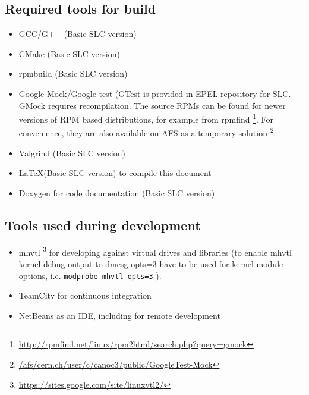 \subsection{Required tools for build}
\begin{itemize}
\item{}GCC/G++ (Basic SLC version)
\item{}CMake (Basic SLC version)
\item{}rpmbuild (Basic SLC version)
\item{}Google Mock/Google test (GTest is provided in EPEL repository for SLC. 
  GMock requires recompilation. The source RPMs can be found for newer versions of RPM based distributions, for example from rpmfind 
  \footnote{ \href{http://rpmfind.net/linux/rpm2html/search.php?query=gmock}{http://rpmfind.net/linux/rpm2html/search.php?query=gmock} }.
 For convenience, 
  they are also available on AFS as a temporary solution
      \footnote{ \href{file:///afs/cern.ch/user/c/canoc3/public/GoogleTest-Mock}{/afs/cern.ch/user/c/canoc3/public/GoogleTest-Mock} }.
\item{}Valgrind (Basic SLC version)
\item{}\LaTeX (Basic SLC version) to compile this document
\item{}Doxygen for code documentation (Basic SLC version)
\end{itemize}

\subsection{Tools used during development}
\begin{itemize}
\item{}mhvtl \footnote{ \href{https://sites.google.com/site/linuxvtl2/}{https://sites.google.com/site/linuxvtl2/} } for developing against virtual drives and libraries (to enable mhvtl kernel debug output to dmesg opts=3 have to be used for kernel module options, i.e.
\small{}\verb#modprobe mhvtl opts=3# ).
\item{}TeamCity for continuous integration
\item{}NetBeans as an IDE, including for remote development\
\end{itemize}

